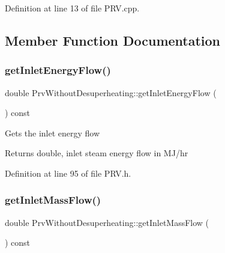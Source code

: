 Definition at line 13 of file P\+R\+V.\+cpp.



\subsection{Member Function Documentation}
\mbox{\label{class_prv_without_desuperheating_a040dbe6a11a722f15450cd00ac454c48}} 
\subsubsection{\texorpdfstring{get\+Inlet\+Energy\+Flow()}{getInletEnergyFlow()}}
{\footnotesize\ttfamily double Prv\+Without\+Desuperheating\+::get\+Inlet\+Energy\+Flow (\begin{DoxyParamCaption}{ }\end{DoxyParamCaption}) const\hspace{0.3cm}{\ttfamily [inline]}}

Gets the inlet energy flow \begin{DoxyReturn}{Returns}
double, inlet steam energy flow in M\+J/hr 
\end{DoxyReturn}


Definition at line 95 of file P\+R\+V.\+h.

\mbox{\label{class_prv_without_desuperheating_a0ae2ed88cc8bd4e69cddc05ef1225811}} 
\subsubsection{\texorpdfstring{get\+Inlet\+Mass\+Flow()}{getInletMassFlow()}}
{\footnotesize\ttfamily double Prv\+Without\+Desuperheating\+::get\+Inlet\+Mass\+Flow (\begin{DoxyParamCaption}{ }\end{DoxyParamCaption}) const\hspace{0.3cm}{\ttfamily [inline]}}

